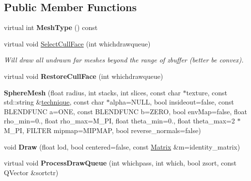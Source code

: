 \subsection*{Public Member Functions}
\begin{DoxyCompactItemize}
\item 
virtual int {\bfseries Mesh\+Type} () const \hypertarget{classSphereMesh_a72257849456a09227173357379c35a7f}{}\label{classSphereMesh_a72257849456a09227173357379c35a7f}

\item 
virtual void \hyperlink{classSphereMesh_ac2189ac6e54ba796fb7072b490dd4184}{Select\+Cull\+Face} (int whichdrawqueue)\hypertarget{classSphereMesh_ac2189ac6e54ba796fb7072b490dd4184}{}\label{classSphereMesh_ac2189ac6e54ba796fb7072b490dd4184}

\begin{DoxyCompactList}\small\item\em Will draw all undrawn far meshes beyond the range of zbuffer (better be convex). \end{DoxyCompactList}\item 
virtual void {\bfseries Restore\+Cull\+Face} (int whichdrawqueue)\hypertarget{classSphereMesh_abe5eeaeea76f30c8adbbd5d38fece2da}{}\label{classSphereMesh_abe5eeaeea76f30c8adbbd5d38fece2da}

\item 
{\bfseries Sphere\+Mesh} (float radius, int stacks, int slices, const char $\ast$texture, const std\+::string \&\hyperlink{classMesh_a987e568f336befda6be200200a92509b}{technique}, const char $\ast$alpha=N\+U\+LL, bool insideout=false, const B\+L\+E\+N\+D\+F\+U\+NC a=O\+NE, const B\+L\+E\+N\+D\+F\+U\+NC b=Z\+E\+RO, bool env\+Map=false, float rho\+\_\+min=0., float rho\+\_\+max=M\+\_\+\+PI, float theta\+\_\+min=0., float theta\+\_\+max=2 $\ast$M\+\_\+\+PI, F\+I\+L\+T\+ER mipmap=M\+I\+P\+M\+AP, bool reverse\+\_\+normals=false)\hypertarget{classSphereMesh_a9fa23394c46f52d8be0298ee242736d9}{}\label{classSphereMesh_a9fa23394c46f52d8be0298ee242736d9}

\item 
void {\bfseries Draw} (float lod, bool centered=false, const \hyperlink{classMatrix}{Matrix} \&m=identity\+\_\+matrix)\hypertarget{classSphereMesh_a9960fdc54be0bdf7ce37520c1cf1c455}{}\label{classSphereMesh_a9960fdc54be0bdf7ce37520c1cf1c455}

\item 
virtual void {\bfseries Process\+Draw\+Queue} (int whichpass, int which, bool zsort, const Q\+Vector \&sortctr)\hypertarget{classSphereMesh_a2c6ac83f7f95a3e8bc76ac674414e734}{}\label{classSphereMesh_a2c6ac83f7f95a3e8bc76ac674414e734}

\end{DoxyCompactItemize}

